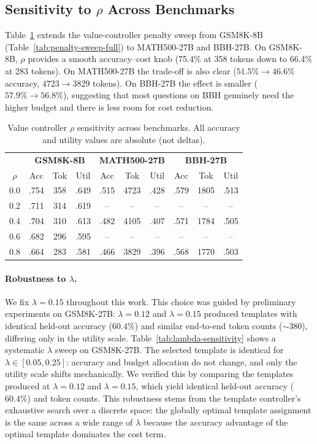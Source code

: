\subsection{Sensitivity to $\rho$ Across Benchmarks}
\label{app:rho-sensitivity}

Table~\ref{tab:rho-multi} extends the value-controller penalty sweep from GSM8K-8B (Table~\ref{tab:penalty-sweep-full}) to MATH500-27B and BBH-27B.
On GSM8K-8B, $\rho$ provides a smooth accuracy--cost knob (75.4\% at 358 tokens down to 66.4\% at 283 tokens).
On MATH500-27B the trade-off is also clear ($51.5\% \to 46.6\%$ accuracy, $4723 \to 3829$ tokens).
On BBH-27B the effect is smaller ($57.9\% \to 56.8\%$), suggesting that most questions on BBH genuinely need the higher budget and there is less room for cost reduction.

\begin{table}[ht]
\centering
\caption{Value controller $\rho$ sensitivity across benchmarks. All accuracy and utility values are absolute (not deltas).}
\label{tab:rho-multi}
\small
\begin{tabular}{@{}cccc|ccc|ccc@{}}
\toprule
& \multicolumn{3}{c|}{\textbf{GSM8K-8B}} & \multicolumn{3}{c|}{\textbf{MATH500-27B}} & \multicolumn{3}{c}{\textbf{BBH-27B}} \\
$\rho$ & Acc & Tok & Util & Acc & Tok & Util & Acc & Tok & Util \\
\midrule
0.0 & .754 & 358 & .649 & .515 & 4723 & .428 & .579 & 1805 & .513 \\
0.2 & .711 & 314 & .619 & -- & -- & -- & -- & -- & -- \\
0.4 & .704 & 310 & .613 & .482 & 4105 & .407 & .571 & 1784 & .505 \\
0.6 & .682 & 296 & .595 & -- & -- & -- & -- & -- & -- \\
0.8 & .664 & 283 & .581 & .466 & 3829 & .396 & .568 & 1770 & .503 \\
\bottomrule
\end{tabular}
\end{table}

\paragraph{Robustness to $\lambda$.}
We fix $\lambda = 0.15$ throughout this work.
This choice was guided by preliminary experiments on GSM8K-27B: $\lambda = 0.12$ and $\lambda = 0.15$ produced templates with identical held-out accuracy ($60.4\%$) and similar end-to-end token counts ($\sim$380), differing only in the utility scale.
Table~\ref{tab:lambda-sensitivity} shows a systematic $\lambda$ sweep on GSM8K-27B.
The selected template is identical for $\lambda \in [0.05, 0.25]$: accuracy and budget allocation do not change, and only the utility scale shifts mechanically.
We verified this by comparing the templates produced at $\lambda = 0.12$ and $\lambda = 0.15$, which yield identical held-out accuracy ($60.4\%$) and token counts.
This robustness stems from the template controller's exhaustive search over a discrete space: the globally optimal template assignment is the same across a wide range of $\lambda$ because the accuracy advantage of the optimal template dominates the cost term.

